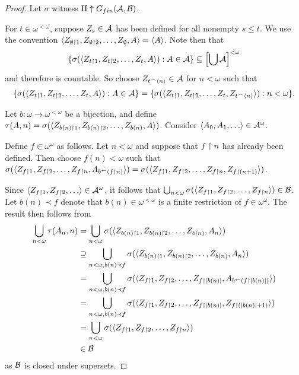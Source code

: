 \documentclass{amsart}
\theoremstyle{plain}
\theoremstyle{definition}
\theoremstyle{remark}
\theoremstyle{plain}
\theoremstyle{definition}
\theoremstyle{remark}
\begin{document}
\begin{proof}
  Let \(\sigma\) witness \(\mathrm{II}\uparrow G_{fin}(\mathcal{A},\mathcal{B})\).

  For \(t\in\omega^{<\omega}\), suppose
  \(Z_s\in\mathcal{A}\) has been defined for all nonempty \(s\leq t\).
  We use the convention
  \(
    \langle Z_{\emptyset\restriction1},Z_{\emptyset\restriction2},\dots,Z_\emptyset,A\rangle
      =
    \langle A\rangle
  \).
  Note then that
  \[
    \{\sigma(\langle Z_{t\restriction1},Z_{t\restriction2},\dots,Z_t,A\rangle):A\in\mathcal{A}\}
      \subseteq
    \left[\bigcup\mathcal{A}\right]^{<\omega}
  \]
  and therefore is countable.
  So choose \(Z_{t{^\frown}\langle n\rangle}\in\mathcal{A}\) for \(n<\omega\) such that
  \[
    \{\sigma(\langle Z_{t\restriction1},Z_{t\restriction2},\dots,Z_t,A\rangle):A\in\mathcal{A}\}
      =
    \{\sigma(\langle Z_{t\restriction1},Z_{t\restriction2},\dots,Z_t,Z_{t{^\frown}\langle n\rangle}\rangle):n<\omega\}
  .\]

  Let \(b:\omega\to\omega^{<\omega}\) be a bijection,
  and define
  \(\tau(A,n)=\sigma(\langle Z_{b(n)\restriction 1},Z_{b(n)\restriction 2},\dots,Z_{b(n)},A\rangle)\).
  Consider \(\<A_0,A_1,\dots\>\in\mc A^\omega\).

  Define \(f\in\omega^\omega\) as follows.
  Let \(n<\omega\) and suppose that \(f\restriction n\) has already
  been defined. Then choose \(f(n)<\omega\) such that
  \(
    \sigma(\langle Z_{f\restriction1},Z_{f\restriction2},\dots,Z_{f\restriction n},A_{b^{\leftarrow}(f\restriction n)}\rangle)
      =
    \sigma(\langle Z_{f\restriction1},Z_{f\restriction2},\dots,Z_{f\restriction n},Z_{f\restriction (n+1)}\rangle)
  \).

  Since \(\<Z_{f\rest1},Z_{f\rest2},\dots\>\in\mc A^\omega\), it follows
  that
  \(
    \bigcup_{n<\omega}\sigma(\langle Z_{f\restriction1},Z_{f\restriction2},\dots,Z_{f\restriction n}\rangle)
      \in
    \mathcal{B}
  \).
  Let \(b(n)\prec f\) denote that \(b(n)\in\omega^{<\omega}\) is a finite
  restriction of \(f\in\omega^\omega\).
  The result then follows from
  \begin{align*}
    \bigcup_{n<\omega}\tau(A_n,n)
      & =
    \bigcup_{n<\omega}
    \sigma(\langle Z_{b(n)\restriction 1},Z_{b(n)\restriction 2},\dots,Z_{b(n)},A_n\rangle)
      \\ & \supseteq
    \bigcup_{n<\omega,b(n)\prec f}
    \sigma(\langle Z_{b(n)\restriction 1},Z_{b(n)\restriction 2},\dots,Z_{b(n)},A_n\rangle)
      \\ & =
    \bigcup_{n<\omega,b(n)\prec f}
    \sigma(\langle Z_{f\restriction 1},Z_{f\restriction 2},\dots,Z_{f\restriction|b(n)|},A_{b^{\leftarrow}(f\restriction|b(n)|)}\rangle)
      \\ & =
    \bigcup_{n<\omega,b(n)\prec f}
    \sigma(\langle Z_{f\restriction 1},Z_{f\restriction 2},\dots,Z_{f\restriction|b(n)|},Z_{f\restriction(|b(n)|+1)}\rangle)
      \\ & =
    \bigcup_{n<\omega}
    \sigma(\langle Z_{f\restriction 1},Z_{f\restriction 2},\dots,Z_{f\restriction n}\rangle)
      \\ & \in
    \mathcal{B}
  \end{align*}
  as \(\mathcal{B}\) is closed under supersets.
\end{proof}
\end{document}
